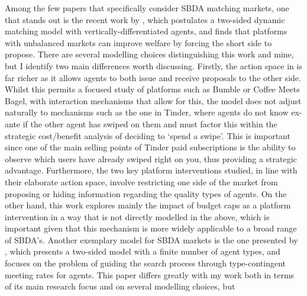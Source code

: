 Among the few papers that specifically consider SBDA matching markets, one that stands out is the recent work by \cite{kanoria2021facilitating}, which postulates a two-sided dynamic matching model with vertically-differentiated agents, and finds that platforms with unbalanced markets can improve welfare by forcing the short side to propose. There are several modelling choices distinguishing this work and mine, but I identify two main differences worth discussing. Firstly, the action space in \cite{kanoria2021facilitating} is far richer as it allows agents to both issue and receive proposals to the other side. Whilst this permits a focused study of platforms such as Bumble or Coffee Meets Bagel, with interaction mechanisms that allow for this, the model does not adjust naturally to mechanisms such as the one in Tinder, where agents do not know ex-ante if the other agent has swiped on them and must factor this within the strategic cost/benefit analysis of deciding to `spend a swipe'. This is important since one of the main selling points of Tinder paid subscriptions is the ability to observe which users have already swiped right on you, thus providing a strategic advantage. Furthermore, the two key platform interventions studied, in line with their elaborate action space, involve restricting one side of the market from proposing or hiding information regarding the quality types of agents. On the other hand, this work explores mainly the impact of budget caps as a platform intervention in a way that is not directly modelled in the above, which is important given that this mechanism is more widely applicable to a broad range of SBDA's. Another exemplary model for SBDA markets is the one presented by \cite{immorlica2021designing}, which presents a two-sided model with a finite number of agent types, and focuses on the problem of guiding the search process through type-contingent meeting rates for agents. This paper differs greatly with my work both in terms of its main research focus and on several modelling choices, but 


